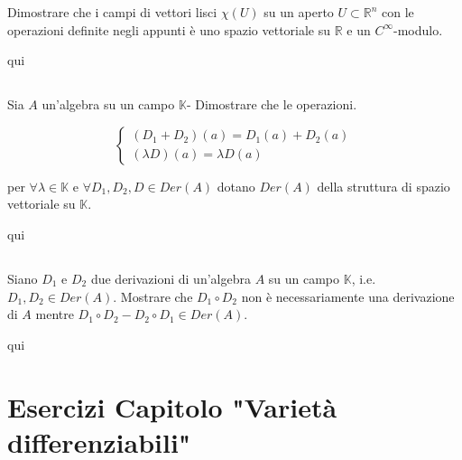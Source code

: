 \begin{tcolorbox}
	Dimostrare che i campi di vettori lisci $ \chi(U) $ su un aperto $ U \subset \mathbb{R}^{n} $ con le operazioni definite negli appunti è uno spazio vettoriale su $ \mathbb{R} $ e un $ C^{\infty} $-modulo.
\end{tcolorbox}

qui

\tocless\section{}\label{es1-10}

\begin{tcolorbox}
	Sia $ A $ un'algebra su un campo $ \mathbb{K} $- Dimostrare che le operazioni.
	
	\begin{equation}
		\begin{cases}
			(D_{1}+D_{2})(a) = D_{1}(a) + D_{2}(a)\\
			(\lambda D)(a) = \lambda D(a)
		\end{cases}
	\end{equation}
	
	per $ \forall \lambda \in \mathbb{K} $ e $ \forall D_{1},D_{2},D \in Der(A) $ dotano $ Der(A) $ della struttura di spazio vettoriale su $ \mathbb{K} $.
\end{tcolorbox}

qui

\tocless\section{}\label{es1-11}

\begin{tcolorbox}
	Siano $ D_{1} $ e $ D_{2} $ due derivazioni di un'algebra $ A $ su un campo $ \mathbb{K} $, i.e. $ D_{1},D_{2} \in Der(A) $. Mostrare che $ D_{1} \circ D_{2} $ non è necessariamente una derivazione di $ A $ mentre $ D_{1} \circ D_{2} - D_{2} \circ D_{1} \in Der(A) $.
\end{tcolorbox}

qui

\chapter{Esercizi Capitolo "Varietà differenziabili"}

\tocless\section{}\label{BONUS2-1}

